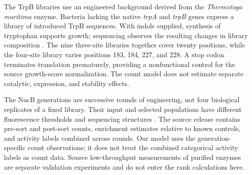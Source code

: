 The TrpB libraries use an engineered background derived from the
\emph{Thermotoga maritima} enzyme. Bacteria lacking the native
\textit{trpA} and \textit{trpB} genes express a library of introduced TrpB
sequences. With indole supplied, synthesis of tryptophan supports growth;
sequencing observes the resulting changes in library composition
\citep{johnston2024}. The nine three-site libraries together cover twenty
positions, while the four-site library varies positions 183, 184, 227, and
228. A stop codon terminates translation prematurely, providing a
nonfunctional control for the source growth-score normalization. The count
model does not estimate separate catalytic, expression, and stability effects.

The NucB generations are successive rounds of engineering, not four biological
replicates of a fixed library. Their input and selected populations have
different fluorescence thresholds and sequencing structures
\citep{thomas2025}. The source release contains pre-sort and post-sort counts,
enrichment estimates relative to known controls, and activity labels combined
across rounds. Our model uses the generation-specific count observations;
it does not treat the combined categorical activity labels as count data.
Source low-throughput measurements of purified enzymes are separate validation
experiments and do not enter the rank calculations here.


